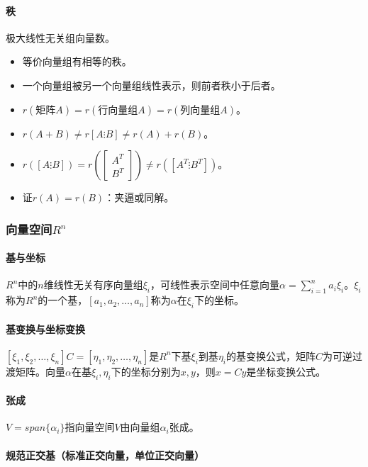 \documentclass[
12pt, %
a4paper, 
oneside, %
headinclude,footinclude, %
]{scrartcl}
\begin{document}
\paragraph{秩}
极大线性无关组向量数。
\begin{itemize}
\item 等价向量组有相等的秩。
\item 一个向量组被另一个向量组线性表示，则前者秩小于后者。
\item $ r(\text{矩阵}A) = r(\text{行向量组}A) = r(\text{列向量组}A) $。
\item $ r(A + B) \neq r[A \vdots B] \neq r(A) + r(B) $。
\item $ r([A \vdots B]) = r(\begin{bmatrix} A^T \\ B^T \end{bmatrix}) \neq r([A^T \vdots B^T]) $。
\item 证$ r(A) = r(B) $：夹逼或同解。
\end{itemize}
\subsubsection[向量空间]{向量空间$ R^n $}
\paragraph{基与坐标}
$ R^n $中的$ n $维线性无关有序向量组$ \xi_i $，可线性表示空间中任意向量$ \alpha = \sum_{i = 1}^n a_i \xi_i $。$ \xi_i $称为$ R^n $的一个基，$ [a_1, a_2, \dots, a_n] $称为$ \alpha $在$ \xi_i $下的坐标。
\paragraph{基变换与坐标变换}
$ [\xi_1, \xi_2, \dots, \xi_n]C = [\eta_1, \eta_2, \dots, \eta_n] $是$ R^n $下基$ \xi_i $到基$ \eta_i $的基变换公式，矩阵$ C $为可逆过渡矩阵。向量$ \alpha $在基$ \xi_i,\eta_i $下的坐标分别为$ x,y $，则$ x = Cy $是坐标变换公式。
\paragraph{张成}
$ V = span\{\alpha_i\} $指向量空间$ V $由向量组$ \alpha_i $张成。
\paragraph{规范正交基（标准正交向量，单位正交向量）}~\\
\end{document}
